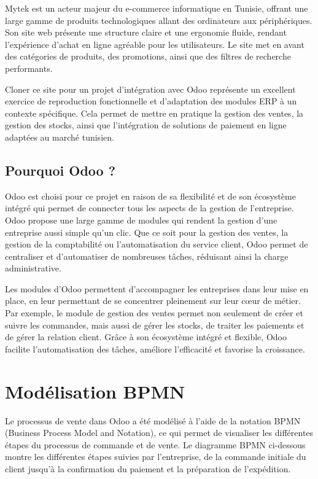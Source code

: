 \documentclass[12pt]{report}
\begin{document}
Mytek est un acteur majeur du e-commerce informatique en Tunisie, offrant une large gamme de produits technologiques allant des ordinateurs aux périphériques. Son site web présente une structure claire et une ergonomie fluide, rendant l’expérience d’achat en ligne agréable pour les utilisateurs. Le site met en avant des catégories de produits, des promotions, ainsi que des filtres de recherche performants.

Cloner ce site pour un projet d’intégration avec Odoo représente un excellent exercice de reproduction fonctionnelle et d’adaptation des modules ERP à un contexte spécifique. Cela permet de mettre en pratique la gestion des ventes, la gestion des stocks, ainsi que l’intégration de solutions de paiement en ligne adaptées au marché tunisien.

\section{Pourquoi Odoo ?}

Odoo est choisi pour ce projet en raison de sa flexibilité et de son écosystème intégré qui permet de connecter tous les aspects de la gestion de l’entreprise. Odoo propose une large gamme de modules qui rendent la gestion d'une entreprise aussi simple qu’un clic. Que ce soit pour la gestion des ventes, la gestion de la comptabilité ou l'automatisation du service client, Odoo permet de centraliser et d'automatiser de nombreuses tâches, réduisant ainsi la charge administrative.

Les modules d’Odoo permettent d'accompagner les entreprises dans leur mise en place, en leur permettant de se concentrer pleinement sur leur cœur de métier. Par exemple, le module de gestion des ventes permet non seulement de créer et suivre les commandes, mais aussi de gérer les stocks, de traiter les paiements et de gérer la relation client. Grâce à son écosystème intégré et flexible, Odoo facilite l’automatisation des tâches, améliore l’efficacité et favorise la croissance.

\chapter{Modélisation BPMN}

Le processus de vente dans Odoo a été modélisé à l’aide de la notation BPMN (Business Process Model and Notation), ce qui permet de visualiser les différentes étapes du processus de commande et de vente. Le diagramme BPMN ci-dessous montre les différentes étapes suivies par l’entreprise, de la commande initiale du client jusqu’à la confirmation du paiement et la préparation de l’expédition.
\end{document}
